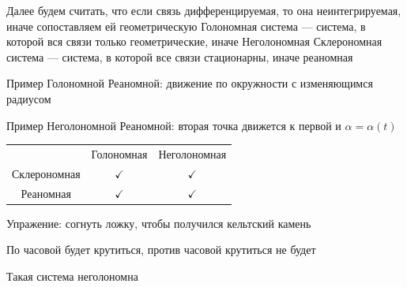 \documentclass[crop=false]{standalone}
\begin{document}
\noindent \keypoint Далее будем считать, что если связь дифференцируемая, то она неинтегрируемая, иначе сопоставляем ей геометрическую
\Def Голономная система — система, в которой вся связи только геометрические, иначе Неголономная
\Def Склерономная система — система, в которой все связи стационарны, иначе реаномная

Пример Голономной Реаномной: движение по окружности с изменяющимся радиусом

Пример Неголономной Реаномной: вторая точка движется к первой и $\alpha = \alpha(t)$
\begin{table}
    \begin{tabular}{c|c|c}
      & Голономная & Неголономная \\
      Склерономная & $\checkmark$  &$\checkmark$ \\
      Реаномная & $\checkmark$  & $\checkmark$   
    \end{tabular}
\end{table}
Упражение: согнуть ложку, чтобы получился кельтский камень

По часовой будет крутиться, против часовой крутиться не будет

Такая система неголономна
\end{document}
